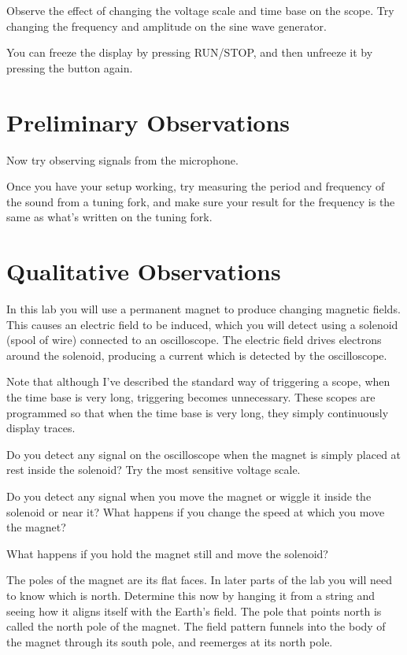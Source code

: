 Observe the effect of changing the voltage scale and time
base on the scope. Try changing the frequency and amplitude
on the sine wave generator.

You can freeze the display by pressing RUN/STOP, and then
unfreeze it by pressing the button again.

\section{Preliminary Observations}

Now try observing signals from the microphone.

Once you have your setup working, try measuring the period
and frequency of the sound from a tuning fork, and make sure
your result for the frequency is the same as what's
written on the tuning fork.
\section{Qualitative Observations}

In this lab you will use a permanent magnet to produce
changing magnetic fields. This causes an electric field to
be induced, which you will detect using a solenoid (spool of
wire) connected to an oscilloscope. The electric field
drives electrons around the solenoid, producing a current
which is detected by the oscilloscope.

Note that although I've described the standard way of triggering
a scope, when the time base is very long, triggering becomes unnecessary.
These scopes are programmed so that when the time base is very long,
they simply continuously display traces.


Do you detect any signal on the oscilloscope when the magnet
is simply placed at rest inside the solenoid? Try the most
sensitive voltage scale.


Do you detect any signal when you move the magnet or wiggle
it inside the solenoid or near it? What happens if you
change the speed at which you move the magnet?


What happens if you hold the magnet still and move the solenoid? 

The poles of the magnet are its flat faces. In later parts
of the lab you will need to know which is north. Determine
this now by hanging it from a string and seeing how it aligns itself with the Earth's field.
The pole that points north is called the north pole of the
magnet. The field pattern funnels into the body of the magnet
through its south pole, and reemerges at its north pole.

